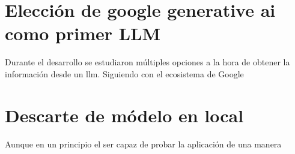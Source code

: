 \section{Elección de google generative ai como primer LLM}
Durante el desarrollo se estudiaron múltiples opciones a la hora de obtener la información desde un \acrshort{llm}. 
Siguiendo con el ecosistema de Google

\section{Descarte de módelo en local}
Aunque en un principio el ser capaz de probar la aplicación de una manera 

